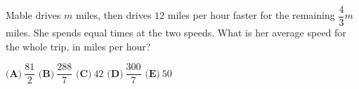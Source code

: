 Mable drives $m$ miles, then drives $12$ miles per hour faster for the remaining $\dfrac43m$ miles. She spends equal times at the two speeds. What is her average speed for the whole trip, in miles per hour?

$\textbf{(A)}\ $$\dfrac{81}2$ \qquad $\textbf{(B)}\ $$\dfrac{288}7$ \qquad $\textbf{(C)}\ $$42$ \qquad $\textbf{(D)}\ $$\dfrac{300}7$ \qquad $\textbf{(E)}\ $$50$
